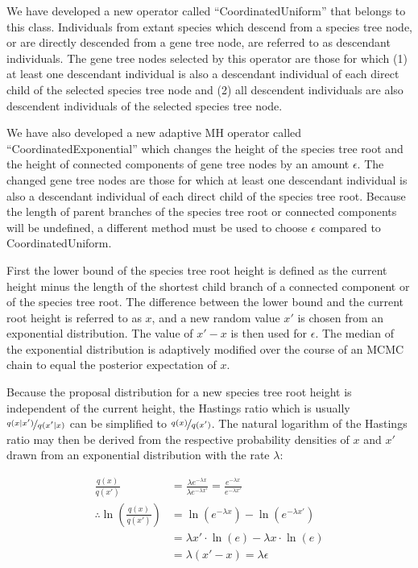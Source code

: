 \documentclass[12pt]{article}
\begin{document}
We have developed a new operator called ``CoordinatedUniform'' that belongs to
this class. Individuals from extant species which descend from a species tree
node, or are directly descended from a gene tree node, are referred to as
descendant individuals. The gene tree nodes selected by this operator are those
for which (1) at least one descendant individual is also a descendant individual
of each direct child of the selected species tree node and (2) all descendent
individuals are also descendent individuals of the selected species tree node.

We have also developed a new adaptive MH \citep{Andrieu2008} operator called
``CoordinatedExponential'' which changes the height of the species tree root and
the height of connected components of gene tree nodes by an amount $\epsilon$.
The changed gene tree nodes are those for which at least one descendant individual
is also a descendant individual of each direct child of the species tree root.
Because the length of parent branches of the species tree root or connected
components will be undefined, a different method must be used to choose
$\epsilon$ compared to CoordinatedUniform.

First the lower bound of the species tree root height is defined as the current
height minus the length of the shortest child branch of a connected component or
of the species tree root. The difference between the lower bound and the current
root height is referred to as $x$, and a new random value $x'$ is chosen from an
exponential distribution. The value of $x' - x$ is then used for $\epsilon$. The
median of the exponential distribution is adaptively modified over the course of
an MCMC chain to equal the posterior expectation of $x$.

Because the proposal distribution for a new species tree root height is
independent of the current height, the Hastings ratio which is usually
$\nicefrac{q(x|x')}{q(x'|x)}$ \citep{2015arXiv150401896R} can be simplified to
$\nicefrac{q(x)}{q(x')}$. The natural logarithm of the Hastings ratio may then
be derived from the respective probability densities of $x$ and
$x'$ drawn from an exponential distribution with the rate $\lambda$:

\begin{align}
\frac{q(x)}{q(x')} &= \frac{\lambda e^{-\lambda x}}{\lambda e^{-\lambda x'}} = \frac{e^{-\lambda x}}{e^{-\lambda x'}}\\
\therefore \ln\left(\frac{q(x)}{q(x')}\right) &= \ln\left(e^{-\lambda x}\right) - \ln\left(e^{-\lambda x'}\right)\\
& = \lambda x' \cdot \ln\left(e\right) - \lambda x \cdot \ln\left(e\right)\\
& = \lambda \left(x' - x\right) = \lambda \epsilon
\end{align}
\end{document}
